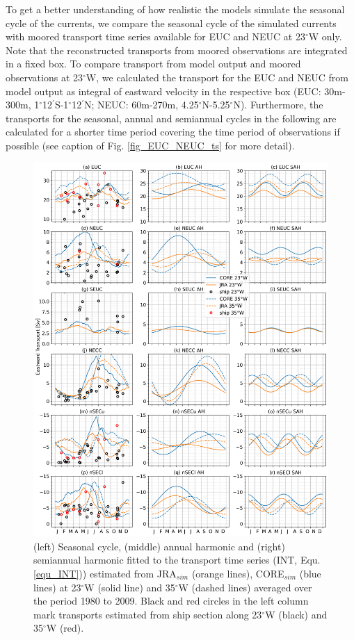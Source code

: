 \documentclass[os, manuscript]{copernicus}
\begin{document}
To get a better understanding of how realistic the models simulate the seasonal cycle of the currents, we compare the seasonal cycle of the simulated currents with moored transport time series available for EUC and NEUC at 23$^{\circ}$W only. Note that the reconstructed transports from moored observations are integrated in a fixed box. To compare transport from model output and moored observations at 23$^{\circ}$W, we calculated the transport for the EUC and NEUC from model output as integral of eastward velocity in the respective box (EUC: 30m-300m, 1$^{\circ}$12$^\prime$S-1$^{\circ}$12$^\prime$N; NEUC: 60m-270m, 4.25$^{\circ}$N-5.25$^{\circ}$N). Furthermore, the transports for the seasonal, annual and semiannual cycles in the following are calculated for a shorter time period covering the time period of observations if possible (see caption of Fig. \ref{fig_EUC_NEUC_ts} for more detail).

\begin{figure}[t]
	\includegraphics[width=12cm]{../../figures/paper/f04_Currents_INT_model_mooring_seas_cyc_JRA1980_2009_CORE1980_2009.png}
	\caption{(left) Seasonal cycle, (middle) annual harmonic and (right) semiannual harmonic fitted to the transport time series (INT, Equ. \ref{equ_INT})) estimated from JRA$_{sim}$ (orange lines), CORE$_{sim}$ (blue lines) at 23$^{\circ}$W (solid line) and 35$^{\circ}$W (dashed lines) averaged over the period 1980 to 2009. Black and red circles in the left column mark transports estimated from ship section along 23$^{\circ}$W (black) and 35$^{\circ}$W (red).}
	\label{fig_seas_cyc_all}
\end{figure} 
\end{document}
